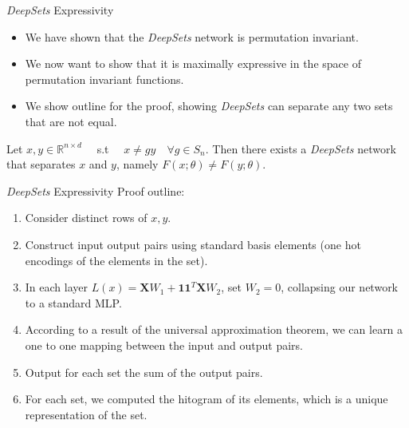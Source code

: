 \documentclass{beamer}
\begin{document}
\begin{frame}{\emph{DeepSets} Expressivity}
    \begin{itemize}
        \setlength{\itemsep}{\fill}
        \item We have shown that the \emph{DeepSets} network is permutation invariant.
        \pause
        \item We now want to show that it is maximally expressive in the space of permutation invariant functions.
        \pause
        \item We show outline for the proof, showing \emph{DeepSets} can separate any two sets that are not equal.

    \end{itemize}
    \pause
    \begin{theorem}
        Let $x,y \in \mathbb{R}^{n \times d} \quad$ s.t $\quad x \neq gy \quad \forall g \in S_n$. Then there exists a \emph{DeepSets} network that separates $x$ and $y$, namely $F(x ; \theta) \neq F(y ; \theta)$. 
    \end{theorem}
    
    

\end{frame}
\begin{frame}{\emph{DeepSets} Expressivity}
    Proof outline:
    \begin{enumerate}
        \setlength{\itemsep}{\fill}
        \pause
        \item Consider distinct rows of $x, y$.
        \pause
        \item Construct input output pairs using standard basis elements (one hot encodings of the elements in the set).
        \item In each layer $L(x) = \mathbf{X}W_1 + \mathbf{1}\mathbf{1}^T\mathbf{X}W_2$, set $W_2 = 0$, collapsing our network to a standard MLP.
        \pause
        \item According to a result of the universal approximation theorem, we can learn a one to one mapping between the input and output pairs.
        \pause
        \item Output for each set the sum of the output pairs.
        \pause
        \item For each set, we computed the  hitogram of its elements, which is a unique representation of the set.
    \end{enumerate}


\end{frame}
\end{document}
